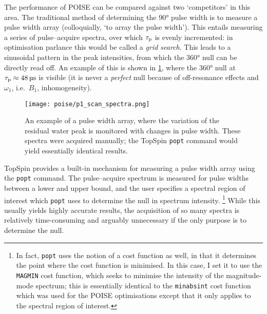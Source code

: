 The performance of POISE can be compared against two `competitors' in this area.
The traditional method of determining the \ang{90} pulse width is to measure a pulse width array (colloquially, `to array the pulse width').\autocite{Keifer1999CMR}
This entails measuring a series of pulse--acquire spectra, over which $\tau_\mathrm{p}$ is evenly incremented: in optimisation parlance this would be called a \textit{grid search}.
This leads to a sinusoidal pattern in the peak intensities, from which the \ang{360} null can be directly read off.
An example of this is shown in \cref{fig:p1_scan_spectra}, where the \ang{360} null at $\taup \approx \SI{48}{\us}$ is visible (it is never a \textit{perfect} null because of off-resonance effects and $\omega_1$, i.e.\ $B_1$, inhomogeneity).

\begin{figure}[htb]
    \centering
    \texttt{[image: poise/p1\_scan\_spectra.png]}
    \caption[Pulse width array]{
        An example of a pulse width array, where the variation of the residual water peak is monitored with changes in pulse width.
        These spectra were acquired manually; the TopSpin \texttt{popt} command would yield essentially identical results.
    }
    \label{fig:p1_scan_spectra}
\end{figure}

TopSpin provides a built-in mechanism for measuring a pulse width array using the \texttt{popt} command.
The pulse--acquire spectrum is measured for pulse widths between a lower and upper bound, and the user specifies a spectral region of interest which \texttt{popt} uses to determine the null in spectrum intensity.%
\footnote{In fact, \texttt{popt} uses the notion of a cost function as well, in that it determines the point where the cost function is minimised. In this case, I set it to use the \texttt{MAGMIN} cost function, which seeks to minimise the intensity of the magnitude-mode spectrum; this is essentially identical to the \texttt{minabsint} cost function which was used for the POISE optimisations except that it only applies to the spectral region of interest.}
While this usually yields highly accurate results, the acquisition of so many spectra is relatively time-consuming and arguably unnecessary if the only purpose is to determine the null.

